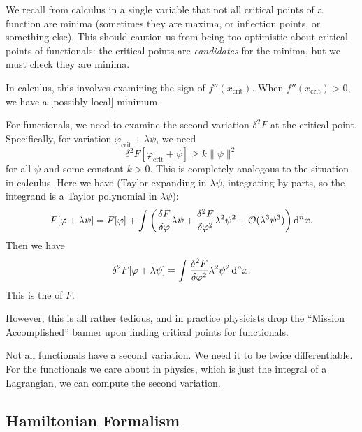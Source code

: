 We recall from calculus in a single variable that not all critical
points of a function are minima (sometimes they are maxima, or
inflection points, or something else). This should caution us from being
too optimistic about critical points of functionals: the critical points
are \emph{candidates} for the minima, but we must check they are minima.

In calculus, this involves examining the sign of
$f''(x_{\text{crit}})$. When $f''(x_{\text{crit}})>0$, we have a
[possibly local] minimum.

For functionals, we need to examine the second variation $\delta^{2}F$
at the critical point. Specifically, for variation $\varphi_{\text{crit}}+\lambda\psi$,
we need
\begin{equation}
\delta^{2}F[\varphi_{\text{crit}}+\psi]\geq k\|\psi\|^{2}
\end{equation}
for all $\psi$ and some constant $k>0$. This is completely analogous to
the situation in calculus. Here we have (Taylor expanding in $\lambda\psi$, integrating by parts,
so the integrand is a Taylor polynomial in $\lambda\psi$):
\begin{equation}
F[\varphi+\lambda\psi] = F[\varphi] + \int\left(\frac{\delta F}{\delta\varphi}\lambda\psi
+\frac{\delta^{2} F}{\delta\varphi^{2}}\lambda^{2}\psi^{2} + \mathcal{O}(\lambda^{3}\psi^{3})\right)\mathrm{d}^{n}x.
\end{equation}
Then we have 
\begin{equation}
\delta^{2}F[\varphi+\lambda\psi] = \int\frac{\delta^{2} F}{\delta\varphi^{2}}\lambda^{2}\psi^{2}\,\mathrm{d}^{n}x.
\end{equation}
This is the  of $F$.

However, this is all rather tedious, and in practice physicists drop the
``Mission Accomplished'' banner upon finding critical points for
functionals.

\begin{ddanger}
Not all functionals have a second variation. We need it to be twice
differentiable. For the functionals we care about in physics, which is
just the integral of a Lagrangian, we can compute the second variation.
\end{ddanger}

\subsection{Hamiltonian Formalism}

